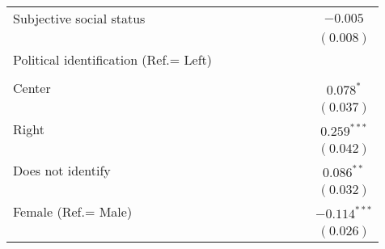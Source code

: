 \documentclass[
  12pt,
]{article}
\begin{document}
\begin{table}
\begin{center}
{\begin{tabular}{l c c c c c c c c}
Subjective social status                              &               &                &                &                &                &                &                & $-0.005$       \\
                                                      &               &                &                &                &                &                &                & $(0.008)$      \\
Political identification (Ref.= Left)                 &               &                &                &                &                &                &                &                \\
                                                      &               &                &                &                &                &                &                &                \\
\quad Center                                          &               &                &                &                &                &                &                & $0.078^{*}$    \\
                                                      &               &                &                &                &                &                &                & $(0.037)$      \\
\quad Right                                           &               &                &                &                &                &                &                & $0.259^{***}$  \\
                                                      &               &                &                &                &                &                &                & $(0.042)$      \\
\quad Does not identify                               &               &                &                &                &                &                &                & $0.086^{**}$   \\
                                                      &               &                &                &                &                &                &                & $(0.032)$      \\
Female (Ref.= Male)                                   &               &                &                &                &                &                &                & $-0.114^{***}$ \\
                                                      &               &                &                &                &                &                &                & $(0.026)$      \\

\end{tabular}}
\end{center}
\end{table}
\end{document}
